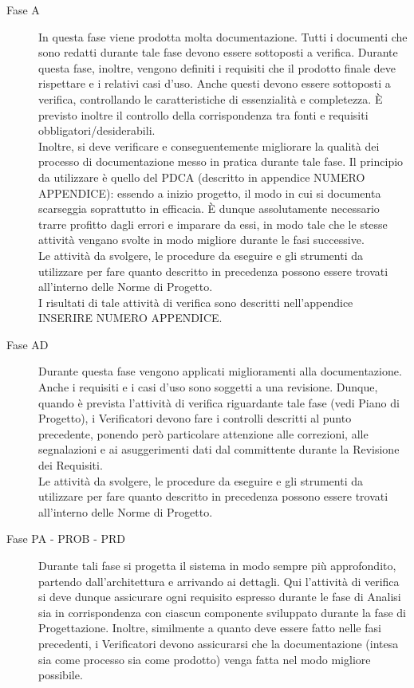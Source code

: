 	\begin{description}
		\item[Fase A] In questa fase viene prodotta molta documentazione. Tutti i documenti che sono redatti durante tale fase devono essere 
		sottoposti a verifica. Durante questa fase, inoltre, vengono definiti i requisiti che il prodotto finale deve rispettare e i relativi casi 
		d'uso. Anche questi devono essere sottoposti a verifica, controllando le caratteristiche di essenzialità e completezza. È previsto inoltre 
		il controllo della corrispondenza tra fonti e requisiti obbligatori/desiderabili.\\
		Inoltre, si deve verificare e conseguentemente migliorare la qualità dei processo di documentazione messo in pratica durante tale fase. Il 
		principio da utilizzare è quello del PDCA (descritto in appendice NUMERO APPENDICE): essendo a inizio progetto, il modo in cui si documenta 
		scarseggia soprattutto in efficacia. È dunque assolutamente necessario trarre profitto dagli errori e imparare da essi, in modo tale che le 
		stesse attività vengano svolte in modo migliore durante le fasi successive.\\
		Le attività da svolgere, le procedure da eseguire e gli strumenti da utilizzare per fare quanto descritto in precedenza possono essere trovati 
		all'interno delle Norme di Progetto.\\
		I risultati di tale attività di verifica sono descritti nell'appendice INSERIRE NUMERO APPENDICE.
		\item[Fase AD] Durante questa fase vengono applicati miglioramenti alla documentazione. Anche i requisiti e i casi d'uso 
		sono soggetti a una revisione. Dunque, quando è prevista l'attività di verifica riguardante tale fase (vedi Piano di Progetto), i Verificatori 
		devono fare i controlli descritti al punto precedente, ponendo però particolare attenzione alle correzioni, alle segnalazioni e ai asuggerimenti 
		dati dal committente durante la Revisione dei Requisiti.\\
		Le attività da svolgere, le procedure da eseguire e gli strumenti da utilizzare per fare quanto descritto in precedenza possono essere trovati 
		all'interno delle Norme di Progetto.\\
		\item[Fase PA - PROB - PRD] Durante tali fase si progetta il sistema in modo sempre più approfondito, partendo dall'architettura e arrivando 
		ai dettagli. Qui l'attività di verifica si deve dunque assicurare ogni requisito espresso durante le fase di Analisi sia in corrispondenza con 
		ciascun componente sviluppato durante la fase di Progettazione. Inoltre, similmente a quanto deve essere fatto nelle fasi precedenti, i Verificatori 
		devono assicurarsi che la documentazione (intesa sia come processo sia come prodotto) venga fatta nel modo migliore possibile.
	\end{description}
